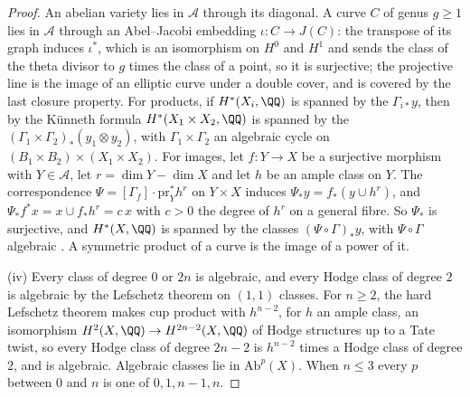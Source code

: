 \begin{proof}
An abelian variety lies in $\mathcal{A}$ through its diagonal. A curve $C$
of genus $g\ge1$ lies in $\mathcal{A}$ through an Abel--Jacobi embedding
$\iota\colon C\to J(C)$: the transpose of its graph induces $\iota^{*}$,
which is an isomorphism on $H^{0}$ and $H^{1}$ and sends the class of the
theta divisor to $g$ times the class of a point, so it is surjective; the
projective line is the image of an elliptic curve under a double cover, and
is covered by the last closure property. For products, if $H^{*}(X_{i},\QQ)$
is spanned by the $\Gamma_{i*}y$, then by the K\"unneth formula
$H^{*}(X_{1}\times X_{2},\QQ)$ is spanned by the
$(\Gamma_{1}\times\Gamma_{2})_{*}(y_{1}\otimes y_{2})$, with
$\Gamma_{1}\times\Gamma_{2}$ an algebraic cycle on
$(B_{1}\times B_{2})\times(X_{1}\times X_{2})$. For images, let
$f\colon Y\to X$ be a surjective morphism with $Y\in\mathcal{A}$, let
$r=\dim Y-\dim X$ and let $h$ be an ample class on $Y$. The correspondence
$\Psi=[\Gamma_{f}]\cdot\mathrm{pr}_{Y}^{*}h^{r}$ on $Y\times X$ induces
$\Psi_{*}y=f_{*}(y\cup h^{r})$, and
$\Psi_{*}f^{*}x=x\cup f_{*}h^{r}=c\,x$ with $c>0$ the degree of $h^{r}$ on a
general fibre. So $\Psi_{*}$ is surjective, and $H^{*}(X,\QQ)$ is spanned by
the classes $(\Psi\circ\Gamma)_{*}y$, with $\Psi\circ\Gamma$ algebraic
\cite[Chapter~16]{Ful98}. A symmetric product of a curve is the image of a
power of it.

(iv) Every class of degree $0$ or $2n$ is algebraic, and every Hodge class of
degree $2$ is algebraic by the Lefschetz theorem on $(1,1)$ classes. For
$n\ge2$, the hard Lefschetz theorem makes cup product with $h^{n-2}$, for $h$
an ample class, an isomorphism $H^{2}(X,\QQ)\to H^{2n-2}(X,\QQ)$ of Hodge
structures up to a Tate twist, so every Hodge class of degree $2n-2$ is
$h^{n-2}$ times a Hodge class of degree $2$, and is algebraic. Algebraic
classes lie in $\mathrm{Ab}^{p}(X)$. When $n\le3$ every $p$ between $0$ and
$n$ is one of $0,1,n-1,n$.
\end{proof}

